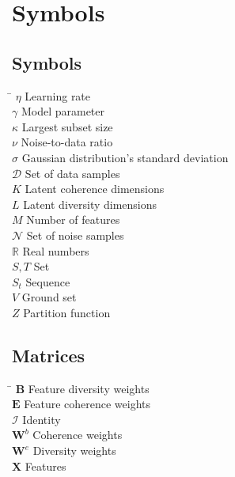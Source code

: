 \chapter*{Symbols}
\label{sec:symbols}


\section*{Symbols}

\begin{tabbing}
 \hspace*{1.6cm} \= \kill
 $\eta$ \> Learning rate \\ [0.5ex]
 $\gamma$ \> Model parameter \\ [0.5ex]
 $\kappa$ \> Largest subset size \\ [0.5ex]
 $\nu$ \> Noise-to-data ratio \\ [0.5ex]
 $\sigma$ \> Gaussian distribution's standard deviation \\ [0.5ex]
 $\mathcal{D}$ \> Set of data samples \\ [0.5ex]
 $K$ \> Latent coherence dimensions \\ [0.5ex]
 $L$ \> Latent diversity dimensions \\ [0.5ex]
 $M$ \> Number of features \\ [0.5ex]
 $\mathcal{N}$ \> Set of noise samples \\ [0.5ex]
 $\mathbb{R}$ \> Real numbers \\ [0.5ex]
 $S,T$ \> Set \\ [0.5ex]
 $S_{t}$ \> Sequence \\ [0.5ex]
 $V$ \> Ground set \\ [0.5ex]
 $Z$ \> Partition function \\ [0.5ex]
\end{tabbing}

\section*{Matrices}

\begin{tabbing}
  \hspace*{1.6cm} \= \kill
  $\mathbf{B}$ \> Feature diversity weights \\ [0.5ex]
  $\mathbf{E}$ \> Feature coherence weights \\ [0.5ex]
  $\mathcal{I}$ \> Identity \\ [0.5ex]
  $\mathbf{W}^{b}$ \> Coherence weights \\ [0.5ex]
  $\mathbf{W}^{e}$ \> Diversity weights \\ [0.5ex]
  $\mathbf{X}$ \> Features \\ [0.5ex]
\end{tabbing}

